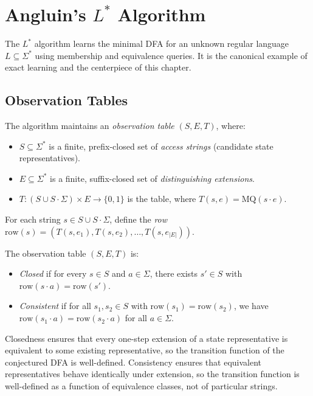 \section{Angluin's $L^*$ Algorithm}
\label{sec:lstar}

The $L^*$ algorithm learns the minimal DFA for an unknown regular language $L \subseteq \Sigma^*$ using membership and equivalence queries. It is the canonical example of exact learning and the centerpiece of this chapter.

\subsection{Observation Tables}

The algorithm maintains an \emph{observation table} $(S, E, T)$, where:
\begin{itemize}[leftmargin=*, itemsep=2pt]
\item $S \subseteq \Sigma^*$ is a finite, prefix-closed set of \emph{access strings} (candidate state representatives).
\item $E \subseteq \Sigma^*$ is a finite, suffix-closed set of \emph{distinguishing extensions}.
\item $T : (S \cup S \cdot \Sigma) \times E \to \{0,1\}$ is the table, where $T(s, e) = \mathrm{MQ}(s \cdot e)$.
\end{itemize}
For each string $s \in S \cup S \cdot \Sigma$, define the \emph{row} $\mathrm{row}(s) = (T(s, e_1), T(s, e_2), \ldots, T(s, e_{|E|}))$.

\begin{defn}
\label{def:closed-consistent}
The observation table $(S, E, T)$ is:
\begin{itemize}[leftmargin=*, itemsep=2pt]
\item \emph{Closed} if for every $s \in S$ and $a \in \Sigma$, there exists $s' \in S$ with $\mathrm{row}(s \cdot a) = \mathrm{row}(s')$.
\item \emph{Consistent} if for all $s_1, s_2 \in S$ with $\mathrm{row}(s_1) = \mathrm{row}(s_2)$, we have $\mathrm{row}(s_1 \cdot a) = \mathrm{row}(s_2 \cdot a)$ for all $a \in \Sigma$.
\end{itemize}
\end{defn}

Closedness ensures that every one-step extension of a state representative is equivalent to some existing representative, so the transition function of the conjectured DFA is well-defined. Consistency ensures that equivalent representatives behave identically under extension, so the transition function is well-defined as a function of equivalence classes, not of particular strings.

